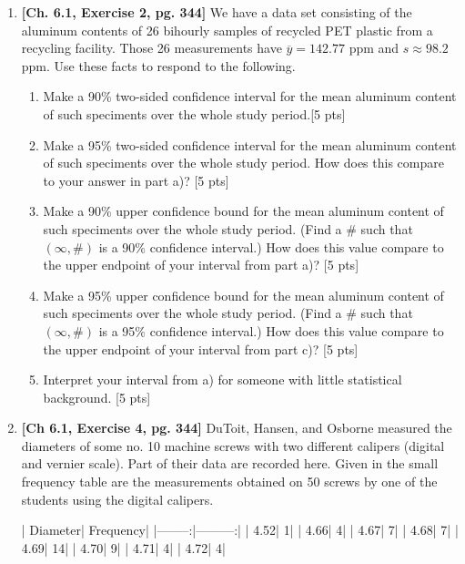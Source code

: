 \documentclass[11pt]{article}\usepackage[]{graphicx}\usepackage[]{color}
\begin{document}
\begin{enumerate}
	
    \item \textbf{[Ch. 6.1, Exercise 2, pg. 344]} We have a data set consisting of the aluminum contents of 26 bihourly samples of recycled PET plastic from a recycling facility. Those 26 measurements have $\overline{y} = 142.77$ ppm and $s \approx 98.2$ ppm. Use these facts to respond to the following.
    
      \begin{enumerate}
        \item Make a 90\% two-sided confidence interval for the mean aluminum content of such speciments over the whole study period.[5 pts]
        \item Make a 95\% two-sided confidence interval for the mean aluminum content of such speciments over the whole study period. How does this compare to your answer in part a)? [5 pts]
        \item Make a 90\% upper confidence bound for the mean aluminum content of such speciments over the whole study period. (Find a # such that $(\infty, \#)$ is a 90\% confidence interval.) How does this value compare to the upper endpoint of your interval from part a)? [5 pts]
        \item Make a 95\% upper confidence bound for the mean aluminum content of such speciments over the whole study period. (Find a # such that $(\infty, \#)$ is a 95\% confidence interval.) How does this value compare to the upper endpoint of your interval from part c)? [5 pts]
        \item Interpret your interval from a) for someone with little statistical background. [5 pts]
      \end{enumerate}
      
    \item \textbf{ [Ch 6.1, Exercise 4, pg. 344]} DuToit, Hansen, and Osborne measured the diameters of some no. 10 machine screws with two different calipers (digital and vernier scale). Part of their data are recorded here. Given in the small frequency table are the measurements obtained on 50 screws by one of the students using the digital calipers.



\begin{Schunk}
\begin{Soutput}
| Diameter| Frequency|
|--------:|---------:|
|     4.52|         1|
|     4.66|         4|
|     4.67|         7|
|     4.68|         7|
|     4.69|        14|
|     4.70|         9|
|     4.71|         4|
|     4.72|         4|
\end{Soutput}
\end{Schunk}
  

\end{enumerate}
\end{document}
